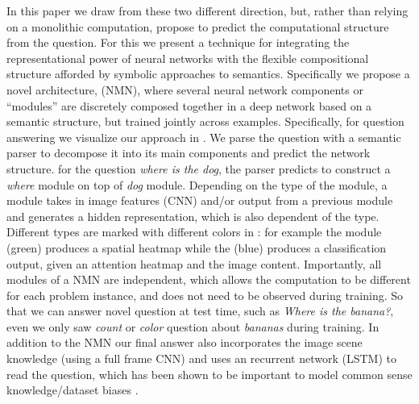 In this paper we draw from these two different direction, but, rather than
relying on a monolithic computation, propose to predict the computational
structure from the question.  For this we present a technique for integrating
the representational power of neural networks with the flexible compositional
structure afforded by symbolic approaches to semantics.  Specifically we propose
a novel architecture, \nmn (NMN), where several neural network components or
``modules'' are discretely composed together in a deep network based on a
semantic structure, but trained jointly across examples.  Specifically, for
question answering we visualize our approach in . We parse
the question with a semantic parser to decompose it into its main components and
predict the network structure. \Eg for the question \emph{where is the dog}, the
parser predicts to construct a \emph{where} module on top of \emph{dog} module.
Depending on the type of the module, a module takes in image features (CNN)
and/or output from a previous module and generates a hidden representation,
which is also dependent of the type. Different types are marked with different
colors in : for example the  module
(green) produces a spatial heatmap while the  (blue)
produces a classification output, given an attention heatmap and the image
content.  Importantly, all modules of a NMN are independent, which allows the
computation to be different for each problem instance, and does not need to be
observed during training. So that we can answer novel question at test time,
such as \emph{Where is the banana?}, even we only saw \emph{count} or
\emph{color} question about \emph{bananas} during training.  In addition to the
NMN our final answer also incorporates the image scene knowledge (using a full
frame CNN) and uses an  recurrent network (LSTM) to read the question, which has
been shown to be important to model common sense knowledge/dataset biases
\cite{malinowski15iccv}.



